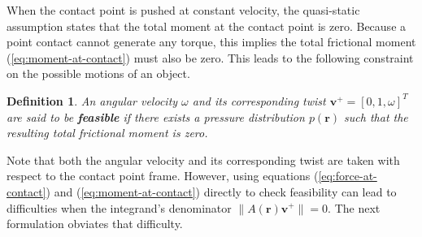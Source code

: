 \documentclass[conference]{IEEEtran}
\newtheorem{definition}{Definition}
\begin{document}
When the contact point is pushed at constant velocity, the
quasi-static assumption states that the total moment at the contact
point is zero. Because a point contact cannot generate any torque,
this implies the total frictional moment (\ref{eq:moment-at-contact})
must also be zero. This leads to the following constraint on the
possible motions of an object.
\begin{definition}
  An angular velocity $\omega$ and its corresponding twist
  $\mathbf{v}^+ = [0,1,\omega]^T$ are said to be \textbf{feasible} if
  there exists a pressure distribution $p(\mathbf{r})$ such that the
  resulting total frictional moment is zero.
\end{definition}
Note that both the angular velocity and its corresponding twist are
taken with respect to the contact point frame. However, using
equations (\ref{eq:force-at-contact}) and (\ref{eq:moment-at-contact})
directly to check feasibility can lead to difficulties when the
integrand's denominator $\lVert A(\mathbf{r})\mathbf{v}^+\rVert =
0$. The next formulation obviates that difficulty.
\end{document}
